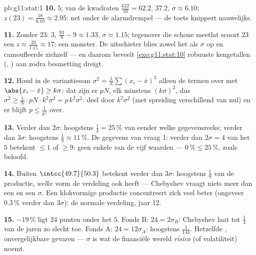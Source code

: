 \begin{solution}{pb:g11:stat:1}
\textbf{10.}  $5$;  van de kwadraten
$\frac{622}{10} = 62.2$,  $37.2$, $\sigma \approx 6.10$;
$z(23) = \frac{18}{6.10} \approx 2.95$: net onder de alarmdrempel --- de
toets knippert nauwelijks.

\textbf{11.} Zonder $23$:  $3$, 
$\frac{93}{9} - 9 \approx 1.33$, $\sigma \approx 1.15$; tegenover die schone
meetlat scoort $23$ een $z \approx \frac{20}{1.15} \approx 17$: een monster.
De uitschieter blies zowel het  als $\sigma$ op en camoufleerde
zichzelf --- en daarom beveelt \cref{exo:g11:stat:10} robuuste kengetallen
(, ) aan zodra besmetting dreigt.

\textbf{12.} Houd in de variantiesom
$\sigma^2 = \frac1N \sum (x_i - \bar x)^2$ alleen de termen over met
$\abs{x_i - \bar x} \geq k\sigma$: dat zijn er $pN$, elk minstens
$(k\sigma)^2$, dus $\sigma^2 \geq \frac{1}{N} \cdot pN \cdot k^2\sigma^2 =
p\,k^2\sigma^2$: deel door $k^2 \sigma^2$ (met spreiding verschillend van
nul) en er blijft $p \leq \frac{1}{k^2}$ over.

\textbf{13.} Verder dan $2\sigma$: hoogstens $\frac14 = 25\,\%$ van eender
welke gegevensreeks; verder dan $3\sigma$: hoogstens
$\frac19 \approx 11\,\%$. De gegevens van vraag 1: verder dan
$2\sigma = 4$ van het  $5$ betekent $\leq 1$ of $\geq 9$: geen
enkele van de vijf waarden --- $0\,\% \leq 25\,\%$, zoals beloofd.

\textbf{14.} Buiten $\intcc{49.7}{50.3}$ betekent verder dan $3\sigma$:
hoogstens $\frac19$ van de productie, \emph{welke} vorm de verdeling ook
heeft --- Chebyshev vraagt niets meer dan een  en een $\sigma$. Een
klokvormige productie concentreert zich veel beter (ongeveer $0.3\,\%$
verder dan $3\sigma$): de normale verdeling, jaar 12.

\textbf{15.} $-19\,\%$ ligt $24$ punten onder het  $5$. Fonds B:
$24 = 2\sigma_B$: Chebyshev laat tot $\frac14$ van de jaren zo slecht toe.
Fonds A: $24 = 12\sigma_A$: hoogstens $\frac{1}{144}$. Hetzelfde ,
onvergelijkbare gevaren --- $\sigma$ is wat de financiële wereld
\emph{risico} (of volatiliteit) noemt.


\end{solution}
